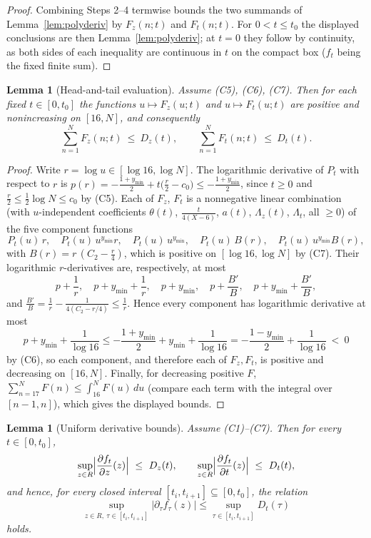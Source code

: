\documentclass[11pt]{article}
\newtheorem{lemma}[theorem]{Lemma}
\theoremstyle{definition}
\begin{document}
\begin{proof}
Combining Steps 2--4 termwise bounds the two summands of
Lemma~\ref{lem:polyderiv} by $F_z(n;t)$ and $F_t(n;t)$. For
$0<t\le t_0$ the displayed conclusions are then
Lemma~\ref{lem:polyderiv}; at $t=0$ they follow by continuity, as
both sides of each inequality are continuous in $t$ on the compact
box ($f_t$ being the fixed finite sum).
\end{proof}

\begin{lemma}[Head-and-tail evaluation]\label{lem:headtail}
Assume (C5), (C6), (C7). Then for each fixed $t\in[0,t_0]$ the
functions $u\mapsto F_z(u;t)$ and $u\mapsto F_t(u;t)$ are positive
and nonincreasing on $[16,N]$, and consequently
\[
\sum_{n=1}^{N}F_z(n;t)\ \le\ D_z(t),
\qquad
\sum_{n=1}^{N}F_t(n;t)\ \le\ D_t(t).
\]
\end{lemma}

\begin{proof}
Write $r=\log u\in[\log16,\log N]$. The logarithmic derivative of
$P_t$ with respect to $r$ is
$p(r)=-\frac{1+y_{\min}}2+t\bigl(\frac r2-c_0\bigr)
\le-\frac{1+y_{\min}}2$, since $t\ge0$ and
$\frac r2\le\frac12\log N\le c_0$ by (C5). Each of $F_z$, $F_t$ is
a nonnegative linear combination (with $u$-independent
coefficients $\theta(t)$, $\frac t{4(X-6)}$, $a(t)$,
$\Lambda_z(t)$, $\Lambda_t$, all $\ge0$) of the five component
functions
\[
P_t(u)\,r,\quad P_t(u)\,u^{y_{\min}}r,\quad
P_t(u)\,u^{y_{\min}},\quad
P_t(u)\,B(r),\quad P_t(u)\,u^{y_{\min}}B(r),
\]
with $B(r)=r\,(C_2-\frac r4)$, which is positive on
$[\log16,\log N]$ by (C7). Their logarithmic $r$-derivatives are,
respectively, at most
\[
p+\frac1r,\quad p+y_{\min}+\frac1r,\quad p+y_{\min},\quad
p+\frac{B'}B,\quad p+y_{\min}+\frac{B'}B,
\]
and $\frac{B'}B=\frac1r-\frac1{4(C_2-r/4)}\le\frac1r$. Hence every
component has logarithmic derivative at most
\[
p+y_{\min}+\frac1{\log16}
\le-\frac{1+y_{\min}}2+y_{\min}+\frac1{\log16}
=-\frac{1-y_{\min}}2+\frac1{\log16}\ <\ 0
\]
by (C6), so each component, and therefore each of $F_z,F_t$, is
positive and decreasing on $[16,N]$. Finally, for decreasing
positive $F$,
$\sum_{n=17}^{N}F(n)\le\int_{16}^{N}F(u)\,du$ (compare each term
with the integral over $[n-1,n]$), which gives the displayed
bounds.
\end{proof}

\begin{lemma}[Uniform derivative bounds]\label{lem:derivbox}
Assume (C1)--(C7). Then for every $t\in[0,t_0]$,
\[
\sup_{z\in R}\Bigl|\frac{\partial f_t}{\partial z}(z)\Bigr|
\ \le\ D_z(t),
\qquad
\sup_{z\in R}\Bigl|\frac{\partial f_t}{\partial t}(z)\Bigr|
\ \le\ D_t(t),
\]
and hence, for every closed interval
$[t_i,t_{i+1}]\subseteq[0,t_0]$, the relation
$$\sup_{z\in R,\ \tau\in[t_i,t_{i+1}]}|\partial_\tau f_\tau(z)|
\le\sup_{\tau\in[t_i,t_{i+1}]}D_t(\tau)$$
holds.
\end{lemma}
\end{document}
